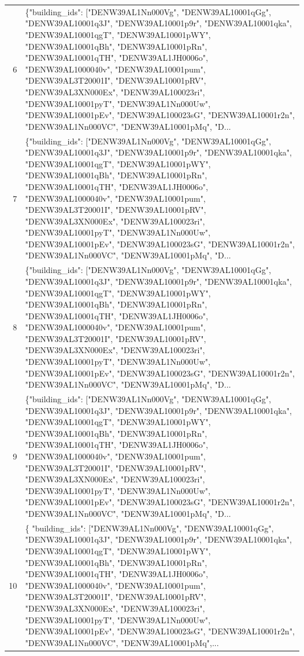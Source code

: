 \documentclass[a4paper,11pt]{article}
\begin{document}
\begin{table}[ht]
\begin{tabular}{r p{12cm}}
6 & \{"building\_ids": ["DENW39AL1Nn000Vg", "DENW39AL10001qGg", "DENW39AL10001q3J", "DENW39AL10001p9r", "DENW39AL10001qka", "DENW39AL10001qgT", "DENW39AL10001pWY", "DENW39AL10001qBh", "DENW39AL10001pRn", "DENW39AL10001qTH", "DENW39AL1JH0006o", "DENW39AL1000040v", "DENW39AL10001pum", "DENW39AL3T20001I", "DENW39AL10001pRV", "DENW39AL3XN000Ex", "DENW39AL100023ri", "DENW39AL10001pyT", "DENW39AL1Nn000Uw", "DENW39AL10001pEv", "DENW39AL100023sG", "DENW39AL10001r2n", "DENW39AL1Nn000VC", "DENW39AL10001pMq", "D... \\
7 & \{"building\_ids": ["DENW39AL1Nn000Vg", "DENW39AL10001qGg", "DENW39AL10001q3J", "DENW39AL10001p9r", "DENW39AL10001qka", "DENW39AL10001qgT", "DENW39AL10001pWY", "DENW39AL10001qBh", "DENW39AL10001pRn", "DENW39AL10001qTH", "DENW39AL1JH0006o", "DENW39AL1000040v", "DENW39AL10001pum", "DENW39AL3T20001I", "DENW39AL10001pRV", "DENW39AL3XN000Ex", "DENW39AL100023ri", "DENW39AL10001pyT", "DENW39AL1Nn000Uw", "DENW39AL10001pEv", "DENW39AL100023sG", "DENW39AL10001r2n", "DENW39AL1Nn000VC", "DENW39AL10001pMq", "D... \\
8 & \{"building\_ids": ["DENW39AL1Nn000Vg", "DENW39AL10001qGg", "DENW39AL10001q3J", "DENW39AL10001p9r", "DENW39AL10001qka", "DENW39AL10001qgT", "DENW39AL10001pWY", "DENW39AL10001qBh", "DENW39AL10001pRn", "DENW39AL10001qTH", "DENW39AL1JH0006o", "DENW39AL1000040v", "DENW39AL10001pum", "DENW39AL3T20001I", "DENW39AL10001pRV", "DENW39AL3XN000Ex", "DENW39AL100023ri", "DENW39AL10001pyT", "DENW39AL1Nn000Uw", "DENW39AL10001pEv", "DENW39AL100023sG", "DENW39AL10001r2n", "DENW39AL1Nn000VC", "DENW39AL10001pMq", "D... \\
9 & \{"building\_ids": ["DENW39AL1Nn000Vg", "DENW39AL10001qGg", "DENW39AL10001q3J", "DENW39AL10001p9r", "DENW39AL10001qka", "DENW39AL10001qgT", "DENW39AL10001pWY", "DENW39AL10001qBh", "DENW39AL10001pRn", "DENW39AL10001qTH", "DENW39AL1JH0006o", "DENW39AL1000040v", "DENW39AL10001pum", "DENW39AL3T20001I", "DENW39AL10001pRV", "DENW39AL3XN000Ex", "DENW39AL100023ri", "DENW39AL10001pyT", "DENW39AL1Nn000Uw", "DENW39AL10001pEv", "DENW39AL100023sG", "DENW39AL10001r2n", "DENW39AL1Nn000VC", "DENW39AL10001pMq", "D... \\
10 & \{
  "building\_ids": ["DENW39AL1Nn000Vg", "DENW39AL10001qGg", "DENW39AL10001q3J", "DENW39AL10001p9r", "DENW39AL10001qka", "DENW39AL10001qgT", "DENW39AL10001pWY", "DENW39AL10001qBh", "DENW39AL10001pRn", "DENW39AL10001qTH", "DENW39AL1JH0006o", "DENW39AL1000040v", "DENW39AL10001pum", "DENW39AL3T20001I", "DENW39AL10001pRV", "DENW39AL3XN000Ex", "DENW39AL100023ri", "DENW39AL10001pyT", "DENW39AL1Nn000Uw", "DENW39AL10001pEv", "DENW39AL100023sG", "DENW39AL10001r2n", "DENW39AL1Nn000VC", "DENW39AL10001pMq",... \\
\hline
\end{tabular}
\end{table}
\end{document}
